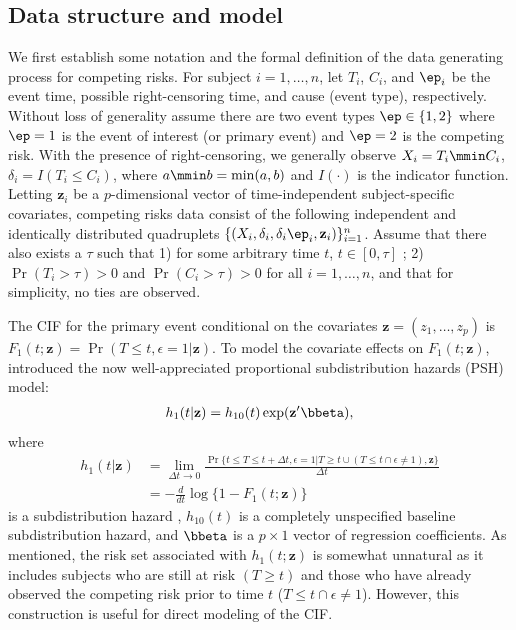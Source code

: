\subsection{Data structure and model}
\label{s3:estimator}
We first establish some notation and the formal definition of the data generating process for competing risks. 
For subject $i = 1, \ldots, n$, let $T_i$, $C_i$, and $\ep_i$ be the event time, possible right-censoring time, and cause (event type), respectively. Without loss of generality assume there are two event types $\ep \in \{1, 2\}$ where $\ep = 1$ is the event of interest (or primary event) and $\ep = 2$ is the competing risk. With the presence of right-censoring, we generally observe $X_i = T_i \mmin C_i$, $\delta_i = I(T_i \leq C_i)$, where $a \mmin b = \min(a, b)$ and $I(\cdot)$ is the indicator function. Letting $\mathbf{z}_i$ be a $p$-dimensional vector of time-independent subject-specific covariates, competing risks data consist of the following independent and identically distributed quadruplets $\{(X_i, \delta_i, \delta_i \ep_i, \mathbf{z}_i)\}_{i=1}^n$. Assume that there also exists a $\tau$ such that  1) for some arbitrary time $t$, $t \in [0, \tau]$ ; 2) $\Pr(T_i > \tau) > 0$ and $\Pr(C_i > \tau) >0$  for all $i = 1,\ldots, n$, and that for simplicity, no ties are observed.

The CIF for the primary event  conditional on the covariates $\mathbf{z} = (z_1, \ldots, z_p)$ is $F_1(t; \mathbf{z}) = \Pr(T \leq t, \epsilon = 1|\mathbf{z})$.  To model the covariate effects on $F_1(t; \mathbf{z})$, \cite{fine1999proportional} introduced the now well-appreciated proportional subdistribution hazards (PSH) model: 
\begin{align}
\label{eq3:pshmodel}
h_1(t| \mathbf{z}) = h_{10}(t) \exp(\mathbf{z}^\prime\bbeta),
\end{align}
where \begin{align*}
h_1(t| \mathbf{z}) & =  \lim_{\Delta t \to 0} \frac{\Pr\{t \leq T \leq t + \Delta t, \epsilon = 1 | T \geq t \cup (T \leq t \cap \epsilon \neq 1), \mathbf{z}\}}{\Delta t} %
\\&  = -\frac{d}{dt} \log\{1 - F_1(t; \mathbf{z})\}
\end{align*}
is a subdistribution hazard \citep{gray1988class}, 
$h_{10}(t)$ is a completely unspecified baseline subdistribution hazard, and $\bbeta$ is a $p \times 1$ vector of regression coefficients. 
As \cite{fine1999proportional} mentioned, the risk set associated with $h_1(t; \mathbf{z})$ is somewhat 
unnatural as it includes subjects who are still at risk $(T \geq t)$ and those who have already observed the competing risk prior to time $t$ ($T \leq t \cap \epsilon \neq 1$). However, this construction is useful  for direct modeling of the CIF.

